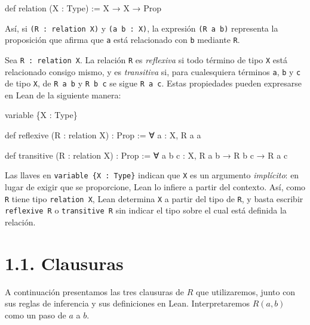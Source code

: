 \documentclass[
  spanish,
  letterpaper,
  DIV=11,
  numbers=noendperiod]{scrreprt}
\newenvironment{Shaded}{\begin{snugshade}}{\end{snugshade}}
\newcommand{\KeywordTok}[1]{\textcolor[rgb]{0.00,0.23,0.31}{\textbf{#1}}}
\newcommand{\NormalTok}[1]{\textcolor[rgb]{0.00,0.23,0.31}{#1}}
\renewcommand{\NormalTok}[1]{\textcolor[HTML]{000000}{#1}}
\renewcommand{\KeywordTok}[1]{\textcolor[HTML]{0000FF}{#1}}
\theoremstyle{remark}
\begin{document}
\begin{Shaded}
\begin{Highlighting}[]
\KeywordTok{def}\NormalTok{ relation (X : }\KeywordTok{Type}\NormalTok{) := X → X → }\KeywordTok{Prop}
\end{Highlighting}
\end{Shaded}

Así, si \texttt{(R\ :\ relation\ X)} y \texttt{(a\ b\ :\ X)}, la
expresión \texttt{(R\ a\ b)} representa la proposición que afirma que
\texttt{a} está relacionado con \texttt{b} mediante \texttt{R}.

Sea \texttt{R\ :\ relation\ X}. La relación \texttt{R} es
\emph{reflexiva} si todo término de tipo \texttt{X} está relacionado
consigo mismo, y es \emph{transitiva} si, para cualesquiera términos
\texttt{a}, \texttt{b} y \texttt{c} de tipo \texttt{X}, de
\texttt{R\ a\ b} y \texttt{R\ b\ c} se sigue \texttt{R\ a\ c}. Estas
propiedades pueden expresarse en Lean de la siguiente manera:

\begin{Shaded}
\begin{Highlighting}[]
\NormalTok{variable \{X : }\KeywordTok{Type}\NormalTok{\}}

\KeywordTok{def}\NormalTok{ reflexive (R : relation X) : }\KeywordTok{Prop}\NormalTok{ :=}
\NormalTok{  ∀ a : X, R a a}

\KeywordTok{def}\NormalTok{ transitive (R : relation X) : }\KeywordTok{Prop}\NormalTok{ :=}
\NormalTok{  ∀ a b c : X, R a b → R b c → R a c}
\end{Highlighting}
\end{Shaded}

Las llaves en \texttt{variable\ \{X\ :\ Type\}} indican que \texttt{X}
es un argumento \emph{implícito}: en lugar de exigir que se proporcione,
Lean lo infiere a partir del contexto. Así, como \texttt{R} tiene tipo
\texttt{relation\ X}, Lean determina \texttt{X} a partir del tipo de
\texttt{R}, y basta escribir \texttt{reflexive\ R} o
\texttt{transitive\ R} sin indicar el tipo sobre el cual está definida
la relación.

\section{1.1. Clausuras}\label{clausuras}

A continuación presentamos las tres clausuras de \(R\) que utilizaremos,
junto con sus reglas de inferencia y sus definiciones en Lean.
Interpretaremos \(R(a,b)\) como un paso de \(a\) a \(b\).
\end{document}
